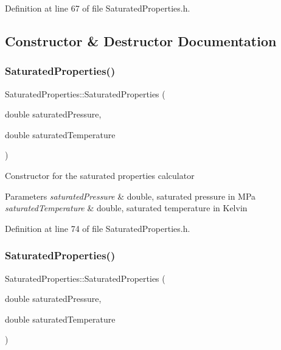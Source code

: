 Definition at line 67 of file Saturated\+Properties.\+h.



\subsection{Constructor \& Destructor Documentation}
\mbox{\label{class_saturated_properties_a83cc16d024ff9bd7ac586df9e946a062}} 
\subsubsection{\texorpdfstring{Saturated\+Properties()}{SaturatedProperties()}\hspace{0.1cm}{\footnotesize\ttfamily [1/3]}}
{\footnotesize\ttfamily Saturated\+Properties\+::\+Saturated\+Properties (\begin{DoxyParamCaption}\item[{double}]{saturated\+Pressure,  }\item[{double}]{saturated\+Temperature }\end{DoxyParamCaption})\hspace{0.3cm}{\ttfamily [inline]}}

Constructor for the saturated properties calculator 
\begin{DoxyParams}{Parameters}
{\em saturated\+Pressure} & double, saturated pressure in M\+Pa \\
\hline
{\em saturated\+Temperature} & double, saturated temperature in Kelvin \\
\hline
\end{DoxyParams}


Definition at line 74 of file Saturated\+Properties.\+h.

\mbox{\label{class_saturated_properties_a83cc16d024ff9bd7ac586df9e946a062}} 
\subsubsection{\texorpdfstring{Saturated\+Properties()}{SaturatedProperties()}\hspace{0.1cm}{\footnotesize\ttfamily [2/3]}}
{\footnotesize\ttfamily Saturated\+Properties\+::\+Saturated\+Properties (\begin{DoxyParamCaption}\item[{double}]{saturated\+Pressure,  }\item[{double}]{saturated\+Temperature }\end{DoxyParamCaption})\hspace{0.3cm}{\ttfamily [inline]}}

